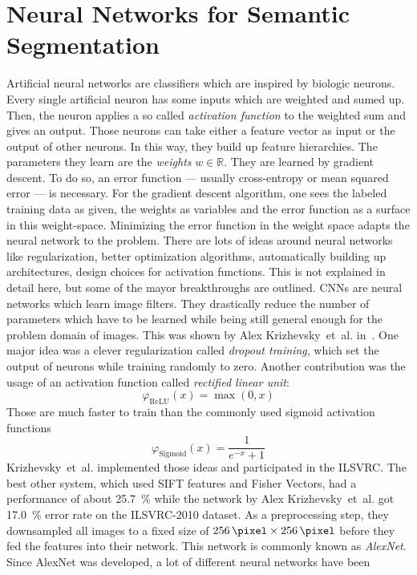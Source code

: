 \documentclass[technote,a4paper,leqno]{IEEEtran}
\begin{document}
\section{Neural Networks for Semantic Segmentation}\label{sec:nn}
Artificial neural networks are classifiers which are inspired by biologic
neurons. Every single artificial neuron has some inputs which are weighted and
sumed up. Then, the neuron applies a so called \textit{activation function} to
the weighted sum and gives an output. Those neurons can take either a feature
vector as input or the output of other neurons. In this way, they build up
feature hierarchies.
The parameters they learn are the \textit{weights} $w \in \mathbb{R}$. They are
learned by gradient descent. To do so, an error function --- usually
cross-entropy or mean squared error --- is necessary. For the gradient descent
algorithm, one sees the labeled training data as given, the weights as
variables and the error function as a surface in this weight-space. Minimizing
the error function in the weight space adapts the neural network to the
problem.
There are lots of ideas around neural networks like regularization, better
optimization algorithms, automatically building up architectures, design
choices for activation functions. This is not explained in detail here, but
some of the mayor breakthroughs are outlined.
\Glspl{CNN} are neural networks which learn image filters. They drastically
reduce the number of parameters which have to be learned while being still
general enough for the problem domain of images. This was shown by Alex
Krizhevsky~et~al. in~\cite{krizhevsky2012imagenet}. One major idea was a clever
regularization called \textit{dropout training}, which set the output of
neurons while training randomly to zero. Another contribution was the usage of
an activation function called \textit{rectified linear unit}:
\[\varphi_{\text{ReLU}}(x) = \max(0, x)\]
Those are much faster to train than the commonly used sigmoid activation
functions
\[\varphi_{\text{Sigmoid}}(x) = \frac{1}{e^{-x} + 1}\]
Krizhevsky~et~al. implemented those ideas and participated in the
\gls{ILSVRC}. The best other system, which used SIFT features and Fisher
Vectors, had a performance of about \SI{25.7}{\percent} while the network by
Alex Krizhevsky~et~al. got \SI{17.0}{\percent} error rate on the ILSVRC-2010
dataset. As a preprocessing step, they downsampled all images to a fixed size
of $\SI{256}{\pixel} \times \SI{256}{\pixel}$ before they fed the features into
their network. This network is commonly known as \textit{AlexNet}.
Since AlexNet was developed, a lot of different neural networks have been
\end{document}
